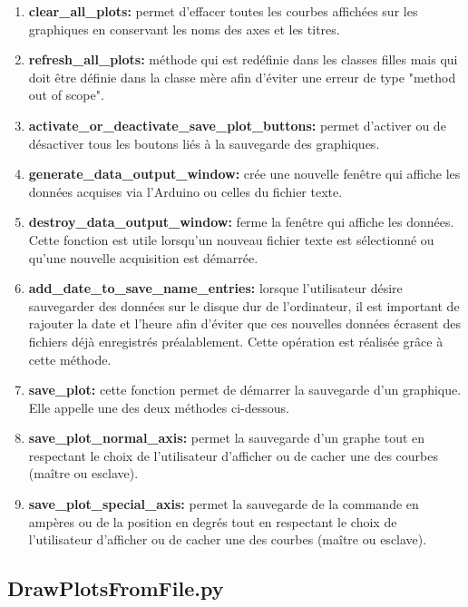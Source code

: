 \begin{enumerate}
    \item \textbf{clear\_all\_plots:} permet d'effacer toutes les courbes affichées sur les graphiques en conservant les noms des axes et les titres.
    
    \item \textbf{refresh\_all\_plots:} méthode qui est redéfinie dans les classes filles mais qui doit être définie dans la classe mère afin d'éviter une erreur de type "method out of scope".
    
    \item \textbf{activate\_or\_deactivate\_save\_plot\_buttons:} permet d'activer ou de désactiver tous les boutons liés à la sauvegarde des graphiques.
    
    \item \textbf{generate\_data\_output\_window:} crée une nouvelle fenêtre qui affiche les données acquises via l'Arduino ou celles du fichier texte.
    
    \item \textbf{destroy\_data\_output\_window:} ferme la fenêtre qui affiche les données. Cette fonction est utile lorsqu'un nouveau fichier texte est sélectionné ou qu'une nouvelle acquisition est démarrée.
    
    
    \item \textbf{add\_date\_to\_save\_name\_entries:} lorsque l'utilisateur désire sauvegarder des données sur le disque dur de l'ordinateur, il est important de rajouter la date et l'heure afin d'éviter que ces nouvelles données écrasent des fichiers déjà enregistrés préalablement. Cette opération est réalisée grâce à cette méthode.
    
    \item \textbf{save\_plot:} cette fonction permet de démarrer la sauvegarde d'un graphique. Elle appelle une des deux méthodes ci-dessous.
    
    \item \textbf{save\_plot\_normal\_axis:} permet la sauvegarde d'un graphe tout en respectant le choix de l'utilisateur d'afficher ou de cacher une des courbes (maître ou esclave).
    
    \item \textbf{save\_plot\_special\_axis:} permet la sauvegarde de la commande en ampères ou de la position en degrés tout en respectant le choix de l'utilisateur d'afficher ou de cacher une des courbes (maître ou esclave).
\end{enumerate}

\subsection{DrawPlotsFromFile.py}

